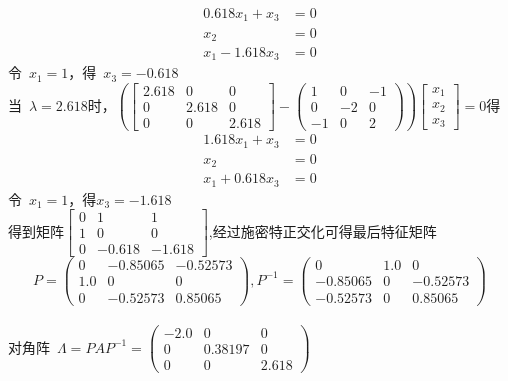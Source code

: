 \documentclass[a4paper]{article}
\begin{document}
\begin{align*}
0.618x_1+x_3 &= 0 \\
x_2 &= 0 \\
x_1-1.618x_3 &=0
\end{align*}
\mbox{令 }$x_1=1$，\mbox{得 }$x_3=-0.618$ \\
\mbox{当 }$ \lambda=2.618$\mbox{时}，$ \left(\left[\begin{array}{ccc} 2.618 & 0 & 0\\ 0 & 2.618 & 0\\ 0 & 0 & 2.618 \end{array}\right]-\left(\begin{array}{ccc} 1 & 0 & -1\\ 0 & -2 & 0\\ -1 & 0 & 2 \end{array}\right)\right)\left[\begin{array}{ccc} x_{1} \\ x_{2}  \\ x_{3} \end{array}\right]=0 $得\\
\begin{align*}
1.618x_1+x_3 &= 0 \\
x_2 &= 0 \\
x_1+0.618x_3 &= 0
\end{align*}
\mbox{令 }$x_1=1$，得$x_3=-1.618$ \\
\mbox{得到矩阵}$ \left[\begin{array}{ccc} 0 & 1 & 1 \\ 1 & 0 & 0 \\ 0 & -0.618 & -1.618\end{array}\right] $,经过施密特正交化可得最后特征矩阵 \\
$$ P=\left(\begin{array}{ccc} 0 & -0.85065 & -0.52573\\ 1.0 & 0 & 0\\ 0 & -0.52573 & 0.85065 \end{array}\right),
P^{-1}=\left(\begin{array}{ccc} 0 & 1.0 & 0\\ -0.85065 & 0 & -0.52573\\ -0.52573 & 0 & 0.85065 \end{array}\right) $$ \\
\mbox{对角阵 }$ \Lambda=PAP^{-1}= \left(\begin{array}{ccc} -2.0 & 0 & 0\\ 0 & 0.38197 & 0\\ 0 & 0 & 2.618 \end{array}\right) $ \\
\end{document}
